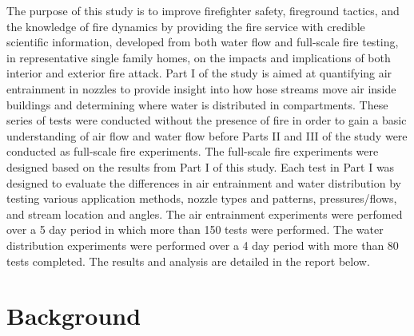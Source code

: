 \documentclass{article}
\begin{document}
The purpose of this study is to improve firefighter safety, fireground tactics, and the knowledge of fire dynamics by providing the fire service with credible scientific information, developed from both water flow and full-scale fire testing, in representative single family homes, on the impacts and implications of both interior and exterior fire attack. Part I of the study is aimed at quantifying air entrainment in nozzles to provide insight into how hose streams move air inside buildings and determining where water is distributed in compartments. These series of tests were conducted without the presence of fire in order to gain a basic understanding of air flow and water flow before Parts II and III of the study were conducted as full-scale fire experiments. The full-scale fire experiments were designed based on the results from Part I of this study. Each test in Part I was designed to evaluate the differences in air entrainment and water distribution by testing various application methods, nozzle types and patterns, pressures/flows, and stream location and angles. The air entrainment experiments were perfomed over a 5 day period in which more than 150 tests were performed. The water distribution experiments were performed over a 4 day period with more than 80 tests completed. The results and analysis are detailed in the report below.

\clearpage

\section{Background}
\end{document}
